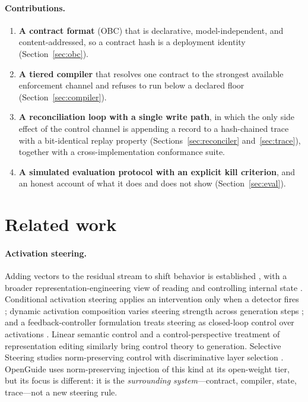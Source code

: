 \documentclass[11pt]{article}
\newcommand{\sys}{OpenGuide}
\newcommand{\obc}{OBC}
\begin{document}
\paragraph{Contributions.}
\begin{enumerate}[nosep,leftmargin=*]
\item \textbf{A contract format} (\obc) that is declarative, model-independent,
  and content-addressed, so a contract hash is a deployment identity
  (Section~\ref{sec:obc}).
\item \textbf{A tiered compiler} that resolves one contract to the strongest
  available enforcement channel and refuses to run below a declared floor
  (Section~\ref{sec:compiler}).
\item \textbf{A reconciliation loop with a single write path}, in which the only
  side effect of the control channel is appending a record to a hash-chained trace
  with a bit-identical replay property (Sections~\ref{sec:reconciler}
  and~\ref{sec:trace}), together with a cross-implementation conformance suite.
\item \textbf{A simulated evaluation protocol with an explicit kill criterion},
  and an honest account of what it does and does not show
  (Section~\ref{sec:eval}).
\end{enumerate}

\section{Related work}
\label{sec:related}

\paragraph{Activation steering.}
Adding vectors to the residual stream to shift behavior is established
\citep{turner2023actadd,rimsky2023caa,li2023iti}, with a broader
representation-engineering view of reading and controlling internal state
\citep{zou2023repe}. Conditional activation steering applies an intervention only
when a detector fires \citep{lee2024cast}; dynamic activation composition varies
steering strength across generation steps \citep{scalena2024dac}; and a
feedback-controller formulation treats steering as closed-loop control over
activations \citep{nguyen2025pidsteer}. Linear semantic control
\citep{cheng2024liseco} and a control-perspective treatment of representation
editing \citep{kong2024recontrol} similarly bring control theory to generation.
Selective Steering studies norm-preserving
control with discriminative layer selection \citep{dang2026selective}. \sys{} uses
norm-preserving injection of this kind at its open-weight tier, but its focus is
different: it is the \emph{surrounding system}---contract, compiler, state,
trace---not a new steering rule.
\end{document}
